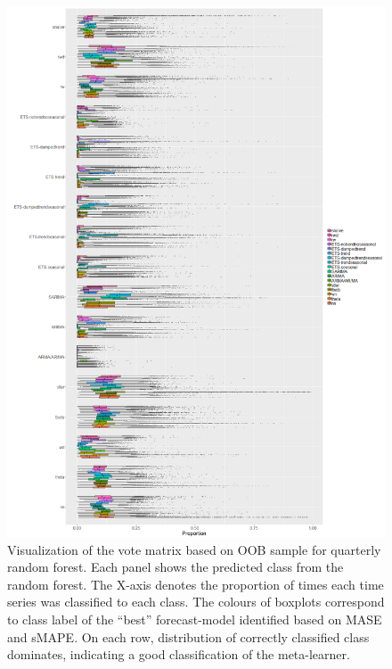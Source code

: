 \documentclass[11pt,a4paper,]{article}
\begin{document}
\begin{figure}
\centering
\includegraphics{figures/oobmonthly-1.png}
\caption{\label{fig:oobmonthly}Visualization of the vote matrix based on OOB sample for quarterly random forest. Each panel shows the predicted class from the random forest. The X-axis denotes the proportion of times each time series was classified to each class. The colours of boxplots correspond to class label of the ``best'' forecast-model identified based on MASE and sMAPE. On each row, distribution of correctly classified class dominates, indicating a good classification of the meta-learner.}
\end{figure}
\end{document}
